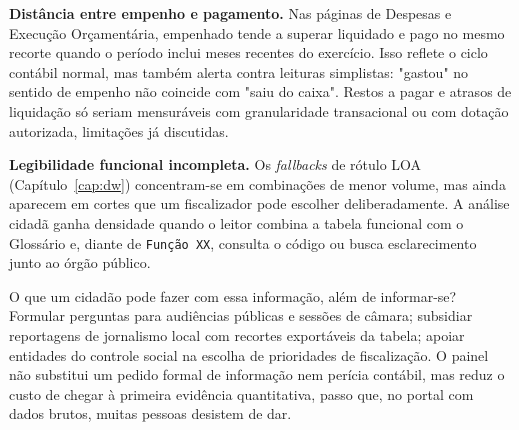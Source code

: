 \textbf{Distância entre empenho e pagamento.} Nas páginas de Despesas e Execução Orçamentária, empenhado tende a superar liquidado e pago no mesmo recorte quando o período inclui meses recentes do exercício. Isso reflete o ciclo contábil normal, mas também alerta contra leituras simplistas: "gastou" no sentido de empenho não coincide com "saiu do caixa". Restos a pagar e atrasos de liquidação só seriam mensuráveis com granularidade transacional ou com dotação autorizada, limitações já discutidas.

\textbf{Legibilidade funcional incompleta.} Os \textit{fallbacks} de rótulo LOA (Capítulo~\ref{cap:dw}) concentram-se em combinações de menor volume, mas ainda aparecem em cortes que um fiscalizador pode escolher deliberadamente. A análise cidadã ganha densidade quando o leitor combina a tabela funcional com o Glossário e, diante de \texttt{Função XX}, consulta o código ou busca esclarecimento junto ao órgão público.

O que um cidadão pode fazer com essa informação, além de informar-se? Formular perguntas para audiências públicas e sessões de câmara; subsidiar reportagens de jornalismo local com recortes exportáveis da tabela; apoiar entidades do controle social na escolha de prioridades de fiscalização. O painel não substitui um pedido formal de informação nem perícia contábil, mas reduz o custo de chegar à primeira evidência quantitativa, passo que, no portal com dados brutos, muitas pessoas desistem de dar.
